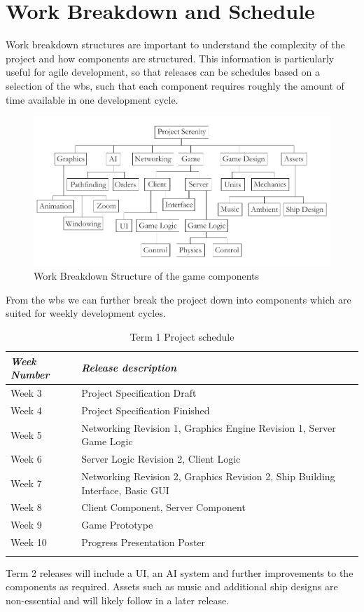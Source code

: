\section{Work Breakdown and Schedule}
Work breakdown structures are important to understand the complexity of the project and how components are structured. This information is particularly useful for agile development, so that releases can be schedules based on a selection of the 
wbs,
 such that each component requires roughly the amount of time available in one development cycle.

\begin{figure}[h!]
	\includegraphics{res/wbs}
	\caption{Work Breakdown Structure of the game components}
\end{figure}

From the 
%
wbs
%
we can further break the project down into components which are suited for weekly development cycles.

\begin{table}
	\begin{tabular}{l p{38em}}
		\toprule
		\emph{Week Number} & \emph{Release description} \\
		\midrule
		Week 3 & Project Specification Draft \\
		Week 4 & Project Specification Finished\\
		Week 5 & Networking Revision 1, Graphics Engine Revision 1, Server Game Logic\\
		Week 6 & Server Logic Revision 2, Client Logic\\
		Week 7 & Networking Revision 2, Graphics Revision 2, Ship Building Interface, Basic GUI\\
		Week 8 & Client Component, Server Component\\
		Week 9 & Game Prototype\\
		Week 10 & Progress Presentation Poster\\
		\bottomrule
		\caption{Term 1 Project schedule}
	\end{tabular}
	\label{tab:schedule}
\end{table}

Term 2 releases will include a UI, an AI system and further improvements to the components as required. Assets such as music and additional ship designs are non-essential and will likely follow in a later release.